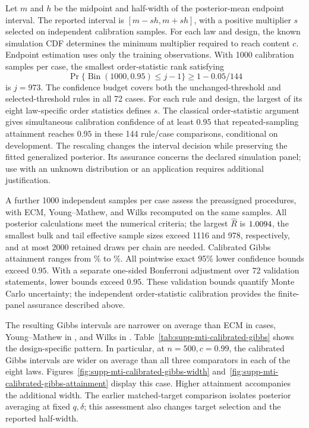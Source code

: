 \documentclass[11pt]{article}
\begin{document}
Let \(m\) and \(h\) be the midpoint and half-width of the posterior-mean
endpoint interval. The reported interval is \([m-sh,m+sh]\), with a
positive multiplier \(s\) selected on independent calibration samples.
For each law and design, the known simulation CDF determines the minimum
multiplier required to reach content \(c\). Endpoint estimation uses only
the training observations. With 1000 calibration samples per case, the smallest
order-statistic rank satisfying
\[
 \Pr\{\operatorname{Bin}(1000,0.95)\le j-1\}
 \ge 1-0.05/144
\]
is \(j=973\). The confidence budget covers both the unchanged-threshold
and selected-threshold rules in all 72 cases. For each rule and design,
the largest of its eight law-specific order statistics defines \(s\).
The classical order-statistic argument
\citep{Wilks1941ToleranceLimits} gives simultaneous calibration confidence
of at least \(0.95\) that repeated-sampling attainment reaches \(0.95\)
in these 144 rule/case comparisons, conditional on development.
The rescaling changes the interval decision while preserving the fitted
generalized posterior. Its assurance concerns the declared simulation
panel; use with an unknown distribution or an application requires
additional justification.

A further 1000 independent samples per case assess the preassigned procedures,
with ECM, Young--Mathew, and Wilks recomputed on the same samples.
All posterior calculations meet the numerical criteria; the largest
\(\widehat R\) is \(1.0094\), the smallest bulk and tail
effective sample sizes exceed 1116 and 978, respectively, and at most
2000 retained draws per chain are needed. Calibrated Gibbs attainment
ranges from \MTIDecisionAttainmentMin\% to \MTIDecisionAttainmentMax\%.
All \MTIDecisionPointwise{} pointwise exact 95\% lower confidence bounds
exceed \(0.95\). With a separate one-sided Bonferroni adjustment over 72
validation statements, \MTIDecisionSimultaneous{} lower bounds exceed
\(0.95\). These validation bounds quantify Monte Carlo uncertainty;
the independent order-statistic calibration provides the finite-panel
assurance described above.

The resulting Gibbs intervals are narrower on average than ECM in
\MTIDecisionShorterECM{} cases, Young--Mathew in
\MTIDecisionShorterYM{}, and Wilks in \MTIDecisionShorterWilks{}.
Table~\ref{tab:supp-mti-calibrated-gibbs} shows the design-specific pattern.
In particular, at \(n=500,c=0.99\), the calibrated Gibbs intervals
are wider on average than all three comparators in each of the eight laws.
Figures~\ref{fig:supp-mti-calibrated-gibbs-width}
and~\ref{fig:supp-mti-calibrated-gibbs-attainment} display this case.
Higher attainment accompanies the additional width. The earlier
matched-target comparison isolates posterior averaging at fixed \(q,\delta\);
this assessment also changes target selection and the reported half-width.
\end{document}
